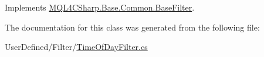 Implements \hyperlink{class_m_q_l4_c_sharp_1_1_base_1_1_common_1_1_base_filter_a506f4cf83b4c4ac1e62d9d5b54bd957b}{M\+Q\+L4\+C\+Sharp.\+Base.\+Common.\+Base\+Filter}.



The documentation for this class was generated from the following file\+:\begin{DoxyCompactItemize}
\item 
User\+Defined/\+Filter/\hyperlink{_time_of_day_filter_8cs}{Time\+Of\+Day\+Filter.\+cs}\end{DoxyCompactItemize}
